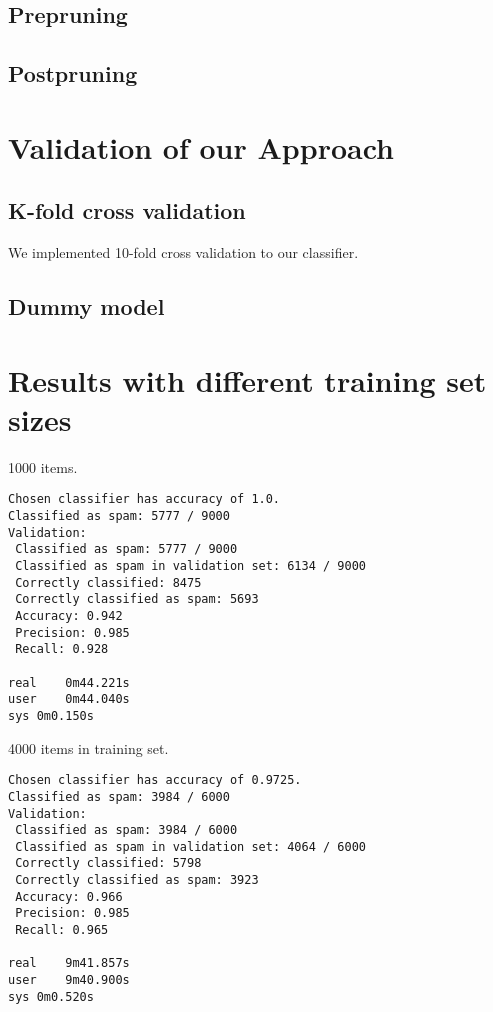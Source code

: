 \documentclass[a4paper,10pt]{article}
\begin{document}
\subsection*{Prepruning}

\subsection*{Postpruning}

\section*{Validation of our Approach}

\subsection*{K-fold cross validation}

We implemented 10-fold cross validation to our classifier.

\subsection*{Dummy model}


\section*{Results with different training set sizes}

1000 items.

\begin{verbatim}
Chosen classifier has accuracy of 1.0.
Classified as spam: 5777 / 9000
Validation:
 Classified as spam: 5777 / 9000
 Classified as spam in validation set: 6134 / 9000
 Correctly classified: 8475
 Correctly classified as spam: 5693
 Accuracy: 0.942
 Precision: 0.985
 Recall: 0.928

real	0m44.221s
user	0m44.040s
sys	0m0.150s
\end{verbatim}

4000 items in training set.

\begin{verbatim}
Chosen classifier has accuracy of 0.9725.
Classified as spam: 3984 / 6000
Validation:
 Classified as spam: 3984 / 6000
 Classified as spam in validation set: 4064 / 6000
 Correctly classified: 5798
 Correctly classified as spam: 3923
 Accuracy: 0.966
 Precision: 0.985
 Recall: 0.965

real	9m41.857s
user	9m40.900s
sys	0m0.520s
\end{verbatim}
\end{document}
